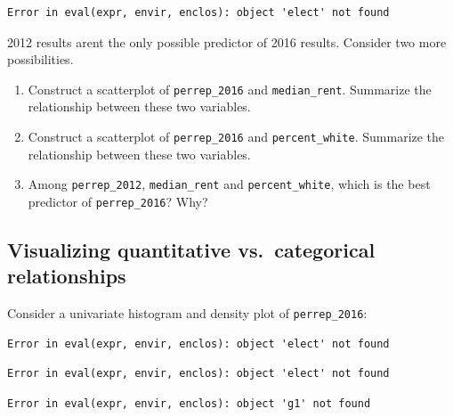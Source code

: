 \documentclass[
  letterpaper,
  DIV=11,
  numbers=noendperiod]{scrreprt}
\newenvironment{Shaded}{\begin{snugshade}}{\end{snugshade}}
\newcommand{\NormalTok}[1]{\textcolor[rgb]{0.00,0.23,0.31}{#1}}
\providecommand{\tightlist}{%
  \setlength{\itemsep}{0pt}\setlength{\parskip}{0pt}}\usepackage{longtable,booktabs,array}
\begin{document}
\begin{verbatim}
Error in eval(expr, envir, enclos): object 'elect' not found
\end{verbatim}

\hfill\break

\begin{Shaded}
\begin{Highlighting}[]
\NormalTok{2012 results aren\textquotesingle{}t the only possible predictor of 2016 results.  Consider two more possibilities.    }
\end{Highlighting}
\end{Shaded}

\begin{enumerate}
\def\labelenumi{\alph{enumi}.}
\tightlist
\item
  Construct a scatterplot of \texttt{perrep\_2016} and
  \texttt{median\_rent}. Summarize the relationship between these two
  variables.\\
\item
  Construct a scatterplot of \texttt{perrep\_2016} and
  \texttt{percent\_white}. Summarize the relationship between these two
  variables.\\
\item
  Among \texttt{perrep\_2012}, \texttt{median\_rent} and
  \texttt{percent\_white}, which is the best predictor of
  \texttt{perrep\_2016}? Why?
\end{enumerate}

\subsection*{Visualizing quantitative vs.~categorical
relationships}\label{visualizing-quantitative-vs.-categorical-relationships}

Consider a univariate histogram and density plot of
\texttt{perrep\_2016}:

\begin{verbatim}
Error in eval(expr, envir, enclos): object 'elect' not found
\end{verbatim}

\begin{verbatim}
Error in eval(expr, envir, enclos): object 'elect' not found
\end{verbatim}

\begin{verbatim}
Error in eval(expr, envir, enclos): object 'g1' not found
\end{verbatim}
\end{document}
